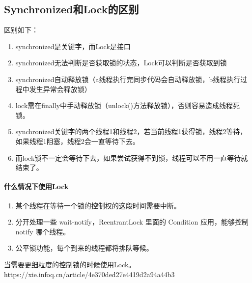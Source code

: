 \documentclass[../../../interview-questions.tex]{subfiles}
\begin{document}
\subsection{Synchronized和Lock的区别}

区别如下：

\begin{enumerate}
    \item {synchronized是关键字，而Lock是接口}
    \item {synchronized无法判断是否获取锁的状态，Lock可以判断是否获取到锁}
    \item {synchronized自动释放锁（a线程执行完同步代码会自动释放锁，b线程执行过程中发生异常会释放锁）}
    \item {lock需在finally中手动释放锁（unlock()方法释放锁），否则容易造成线程死锁。}
    \item {synchronized关键字的两个线程1和线程2，若当前线程1获得锁，线程2等待，如果线程1阻塞，线程2会一直等待下去。}
    \item {而lock锁不一定会等待下去，如果尝试获得不到锁，线程可以不用一直等待就结束了。}
\end{enumerate}

\paragraph{什么情况下使用Lock}

\begin{enumerate}
    \item {某个线程在等待一个锁的控制权的这段时间需要中断。}
    \item {分开处理一些 wait-notify，ReentrantLock 里面的 Condition 应用，能够控制 notify 哪个线程。}
    \item {公平锁功能，每个到来的线程都将排队等候。}
\end{enumerate}

当需要更细粒度的控制锁的时候使用Lock。https://xie.infoq.cn/article/4e370ded27e4419d2a94a44b3
\end{document}
